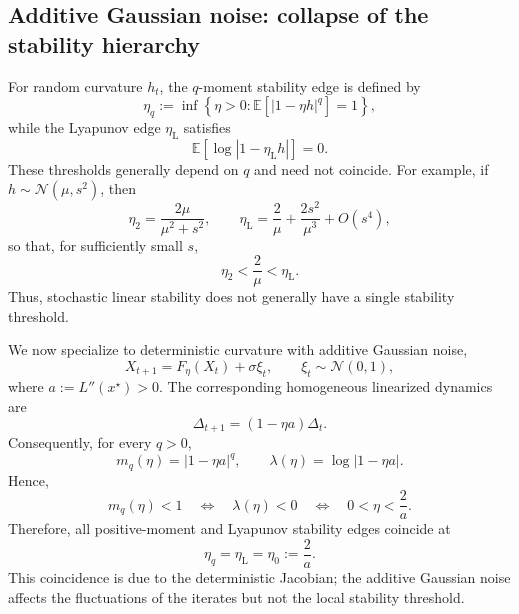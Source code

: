 \documentclass{article} %
\theoremstyle{plain}
\theoremstyle{definition}
\newcommand{\E}{\mathbb{E}}
\begin{document}
\subsection{Additive Gaussian noise: collapse of the stability hierarchy}

For random curvature $h_t$, the $q$-moment stability edge is defined by
\begin{equation}
    \eta_q
    :=
    \inf\left\{
        \eta>0:
        \E\!\left[|1-\eta h|^q\right]=1
    \right\},
\end{equation}
while the Lyapunov edge $\eta_{\mathrm L}$ satisfies
\begin{equation}
    \E\!\left[\log|1-\eta_{\mathrm L}h|\right]=0.
\end{equation}
These thresholds generally depend on $q$ and need not coincide. For example, if
$h\sim\mathcal N(\mu,s^2)$, then
\begin{equation}
    \eta_2=\frac{2\mu}{\mu^2+s^2},
    \qquad
    \eta_{\mathrm L}
    =
    \frac{2}{\mu}
    +
    \frac{2s^2}{\mu^3}
    +
    O(s^4),
\end{equation}
so that, for sufficiently small $s$,
\begin{equation}
    \eta_2<\frac{2}{\mu}<\eta_{\mathrm L}.
\end{equation}
Thus, stochastic linear stability does not generally have a single stability threshold.

We now specialize to deterministic curvature with additive Gaussian noise,
\begin{equation}
    X_{t+1}=F_\eta(X_t)+\sigma\xi_t,
    \qquad
    \xi_t\sim\mathcal N(0,1),
\end{equation}
where $a:=L''(x^\star)>0$. The corresponding homogeneous linearized dynamics are
\begin{equation}
    \Delta_{t+1}=(1-\eta a)\Delta_t.
\end{equation}
Consequently, for every $q>0$,
\begin{equation}
    m_q(\eta)=|1-\eta a|^q,
    \qquad
    \lambda(\eta)=\log|1-\eta a|.
\end{equation}
Hence,
\begin{equation}
    m_q(\eta)<1
    \quad\Longleftrightarrow\quad
    \lambda(\eta)<0
    \quad\Longleftrightarrow\quad
    0<\eta<\frac{2}{a}.
\end{equation}
Therefore, all positive-moment and Lyapunov stability edges coincide at
\begin{equation}
    \eta_q=\eta_{\mathrm L}=\eta_0:=\frac{2}{a}.
\end{equation}
This coincidence is due to the deterministic Jacobian; the additive Gaussian
noise affects the fluctuations of the iterates but not the local stability
threshold.
\end{document}
